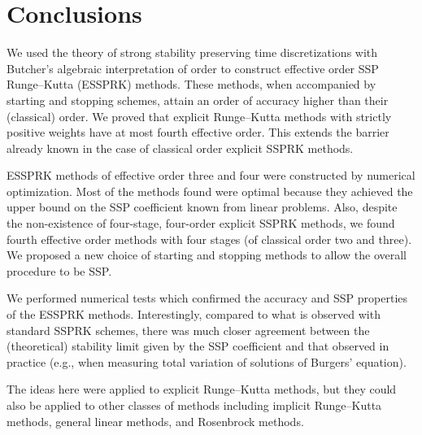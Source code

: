 \section{Conclusions}\label{sec:Conclusion}
We used the theory of strong stability preserving time discretizations
with Butcher's algebraic interpretation of order to construct
effective order SSP Runge--Kutta (ESSPRK) methods. 
These methods, when accompanied by starting and stopping
schemes, attain an order of accuracy higher than their (classical) order.
We proved that explicit Runge--Kutta methods with strictly positive 
weights have at most fourth effective order. 
This extends the barrier already known in the case of classical order
explicit SSPRK methods.

ESSPRK methods of effective order three and four
were constructed by numerical optimization.
Most of the methods found were optimal because they achieved
the upper bound on the SSP coefficient known from linear
problems.
Also, despite the non-existence of four-stage, four-order explicit SSPRK methods, 
we found fourth effective order methods with four stages (of classical 
order two and three). 
We proposed a new choice of starting and stopping methods to allow the
overall procedure to be SSP.

We performed numerical tests which confirmed the accuracy and
SSP properties of the ESSPRK methods.
Interestingly, compared to what is observed with standard SSPRK schemes,
there was much closer agreement between the (theoretical) stability limit
given by the SSP coefficient and that observed in practice
(e.g., when measuring total variation of solutions of Burgers' equation).

The ideas here were applied to explicit Runge--Kutta methods, but they
could also be applied to other classes of methods including implicit
Runge--Kutta methods, general linear methods, and Rosenbrock methods.
